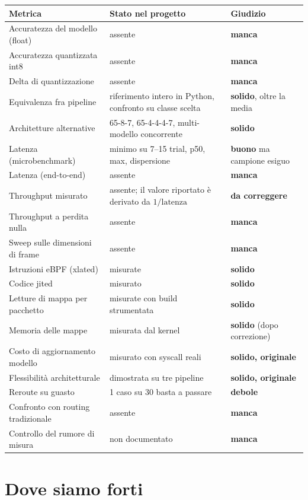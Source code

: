 \documentclass[11pt,a4paper,oneside]{report}
\begin{document}
\begin{longtable}{p{4.2cm}p{4.6cm}p{4.6cm}}
\toprule
\textbf{Metrica} & \textbf{Stato nel progetto} & \textbf{Giudizio} \\
\midrule
\endhead
Accuratezza del modello (float) & assente & \textbf{manca} \\
Accuratezza quantizzata int8 & assente & \textbf{manca} \\
Delta di quantizzazione & assente & \textbf{manca} \\
\midrule
Equivalenza fra pipeline & riferimento intero in Python, confronto su classe scelta & \textbf{solido}, oltre la media \\
Architetture alternative & 65-8-7, 65-4-4-4-7, multi-modello concorrente & \textbf{solido} \\
\midrule
Latenza (microbenchmark) & minimo su 7--15 trial, p50, max, dispersione & \textbf{buono} ma campione esiguo \\
Latenza (end-to-end) & assente & \textbf{manca} \\
Throughput misurato & assente; il valore riportato è derivato da $1/\text{latenza}$ & \textbf{da correggere} \\
Throughput a perdita nulla & assente & \textbf{manca} \\
Sweep sulle dimensioni di frame & assente & \textbf{manca} \\
\midrule
Istruzioni eBPF (xlated) & misurate & \textbf{solido} \\
Codice jited & misurato & \textbf{solido} \\
Letture di mappa per pacchetto & misurate con build strumentata & \textbf{solido} \\
Memoria delle mappe & misurata dal kernel & \textbf{solido} (dopo correzione) \\
\midrule
Costo di aggiornamento modello & misurato con syscall reali & \textbf{solido, originale} \\
Flessibilità architetturale & dimostrata su tre pipeline & \textbf{solido, originale} \\
\midrule
Reroute su guasto & 1 caso su 30 basta a passare & \textbf{debole} \\
Confronto con routing tradizionale & assente & \textbf{manca} \\
Controllo del rumore di misura & non documentato & \textbf{manca} \\
\bottomrule
\end{longtable}

\section{Dove siamo forti}
\end{document}
